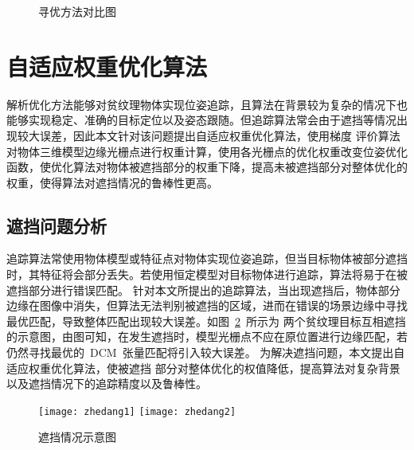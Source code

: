 \begin{figure}[t] %
  \centering%
  \vskip0.2cm
  \vskip0.2cm
  \caption{寻优方法对比图}
  \label{fig:chap03:compare_Optimiz}
\end{figure}

\section{自适应权重优化算法}
\label{sec:Weight optimization algorithm}
解析优化方法能够对贫纹理物体实现位姿追踪，且算法在背景较为复杂的情况下也能够实现稳定、准确的目标定位以及姿态跟随。但追踪算法常会由于遮挡等情况出现较大误差，因此本文针对该问题提出自适应权重优化算法，使用梯度
评价算法对物体三维模型边缘光栅点进行权重计算，使用各光栅点的优化权重改变位姿优化函数，使优化算法对物体被遮挡部分的权重下降，提高未被遮挡部分对整体优化的权重，使得算法对遮挡情况的鲁棒性更高。
\subsection{遮挡问题分析}
\label{sec:Analysis of occlusion problem}
追踪算法常使用物体模型或特征点对物体实现位姿追踪，但当目标物体被部分遮挡时，其特征将会部分丢失。若使用恒定模型对目标物体进行追踪，算法将易于在被遮挡部分进行错误匹配。
针对本文所提出的追踪算法，当出现遮挡后，物体部分边缘在图像中消失，但算法无法判别被遮挡的区域，进而在错误的场景边缘中寻找最优匹配，导致整体匹配出现较大误差。如图~\ref{fig:chap03:zhedang}~所示为
两个贫纹理目标互相遮挡的示意图，由图可知，在发生遮挡时，模型光栅点不应在原位置进行边缘匹配，若仍然寻找最优的~DCM~张量匹配将引入较大误差。
为解决遮挡问题，本文提出自适应权重优化算法，使被遮挡
部分对整体优化的权值降低，提高算法对复杂背景以及遮挡情况下的追踪精度以及鲁棒性。

\begin{figure}[t] %
  \centering%
    \texttt{[image: zhedang1]}\hspace{2em}%
    \texttt{[image: zhedang2]}%
  \caption{遮挡情况示意图}
  \label{fig:chap03:zhedang}
\end{figure}

